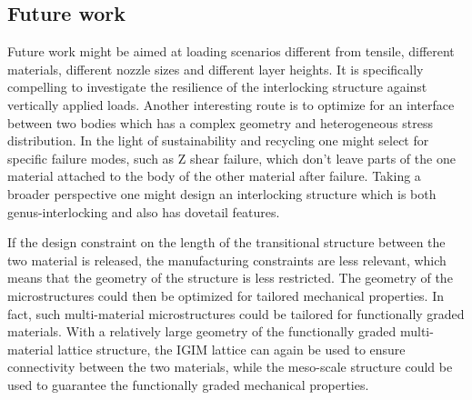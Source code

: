 \subsection{Future work}
Future work might be aimed at loading scenarios different from tensile, different materials, different nozzle sizes and different layer heights.
It is specifically compelling to investigate the resilience of the interlocking structure against vertically applied loads.
Another interesting route is to optimize for an interface between two bodies which has a complex geometry and heterogeneous stress distribution.
In the light of sustainability and recycling one might select for specific failure modes, such as Z shear failure, which don't leave parts of the one material attached to the body of the other material after failure.
Taking a broader perspective one might design an interlocking structure which is both genus-interlocking and also has dovetail features.

If the design constraint on the length of the transitional structure between the two material is released,
the manufacturing constraints are less relevant, which means that the geometry of the structure is less restricted.
The geometry of the microstructures could then be optimized for tailored mechanical properties.
In fact, such multi-material microstructures could be tailored for functionally graded materials.
With a relatively large geometry of the functionally graded multi-material lattice structure,
the IGIM lattice can again be used to ensure connectivity between the two materials,
while the meso-scale structure could be used to guarantee the functionally graded mechanical properties.
